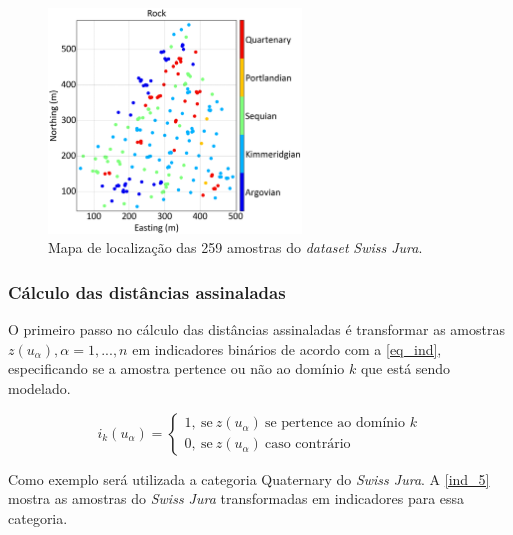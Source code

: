 \begin{figure}[H]
	\centering
	\caption{\label{jura_pontos}Mapa de localização das 259 amostras do \textit{dataset} \textit{Swiss Jura}.}
	\includegraphics[width=0.6\textwidth]{capitulo_2/imagens/points.png}
\end{figure}

\subsubsection{Cálculo das distâncias assinaladas}\label{calc_dist}

O primeiro passo no cálculo das distâncias assinaladas é transformar as amostras ${z(u_\alpha),\alpha=1,...,n}$ em indicadores binários de acordo com a \autoref{eq_ind}, especificando se a amostra pertence ou não ao domínio $k$ que está sendo modelado.

\begin{equation}
	i_k(u_\alpha)=\begin{cases}
	1,\:\textrm{se}\:z(u_\alpha)\:\textrm{se pertence ao domínio $k$}\\
	0,\:\textrm{se}\:z(u_\alpha)\:\textrm{caso contrário}\end{cases}
    \label{eq_ind}
\end{equation}

Como exemplo será utilizada a categoria Quaternary do \textit{Swiss Jura}. A \autoref{ind_5} mostra as amostras do \textit{Swiss Jura} transformadas em indicadores para essa categoria.

